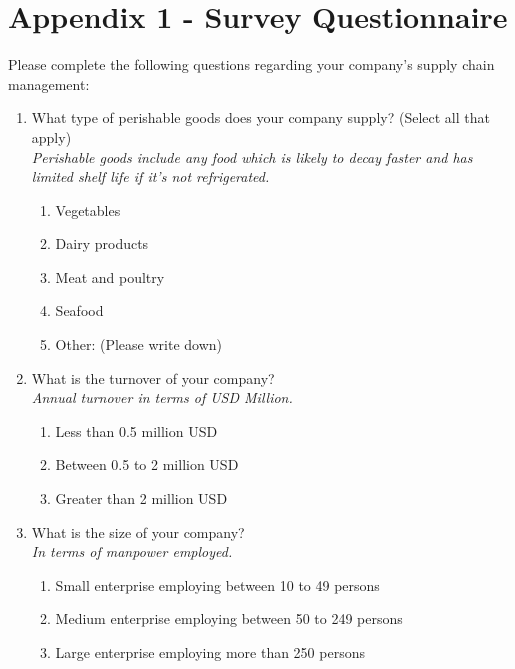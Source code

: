 \chapter{Appendix 1 - Survey Questionnaire}
\label{appendix:survey}

\noindent Please complete the following questions regarding your company's supply chain management:

\begin{enumerate}[label=\textbf{Q\arabic*:},leftmargin=*]
    \item What type of perishable goods does your company supply? (Select all that apply)\\
    \textit{Perishable goods include any food which is likely to decay faster and has limited shelf life if it's not refrigerated.}
    \begin{enumerate}[label=\arabic*., leftmargin=2em]
        \item Vegetables
        \item Dairy products
        \item Meat and poultry
        \item Seafood
        \item Other: (Please write down)
    \end{enumerate}
    
    \item What is the turnover of your company?\\
    \textit{Annual turnover in terms of USD Million.}
    \begin{enumerate}[label=\arabic*., leftmargin=2em]
        \item Less than 0.5 million USD
        \item Between 0.5 to 2 million USD
        \item Greater than 2 million USD
    \end{enumerate}
    
    \item What is the size of your company?\\
    \textit{In terms of manpower employed.}
    \begin{enumerate}[label=\arabic*., leftmargin=2em]
        \item Small enterprise employing between 10 to 49 persons
        \item Medium enterprise employing between 50 to 249 persons
        \item Large enterprise employing more than 250 persons
    \end{enumerate}
    

\end{enumerate}
